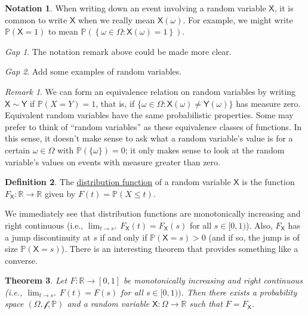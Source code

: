 \documentclass[11pt]{article}
\newcommand{\col}[1]{\mathscr{#1}}
\newcommand{\rv}[1]{\mathsf{#1}}
\newcommand{\p}{\mathbb{P}}
\newcommand{\defname}[1]{\underline{#1}}
\newcommand{\RR}{\mathbb{R}}
\theoremstyle{theorem}
\newtheorem{theorem}{Theorem}[section]
\theoremstyle{definition}
\newtheorem{definition}[theorem]{Definition}
\newtheorem{notation}[theorem]{Notation}
\theoremstyle{remark}
\newtheorem*{remark}{Remark}
\theoremstyle{step}
\theoremstyle{gap}
\newtheorem*{gap}{Gap}
\begin{document}
\begin{notation}
When writing down an event involving a random variable \(\rv{X}\), it is common to write \(\rv{X}\) when we really mean \(\rv{X}(\omega)\). For example, we might write \(\p(\rv{X} = 1)\) to mean \(\p\left(\left\{\omega \in \Omega : \rv{X}(\omega) = 1\right\}\right)\).
\end{notation}

\begin{gap}
The notation remark above could be made more clear.
\end{gap}

\begin{gap}
Add some examples of random variables.
\end{gap}

\begin{remark}
We can form an equivalence relation on random variables by writing \(\rv{X} \sim \rv{Y}\) if \(\p(X=Y)=1\), that is, if \(\{\omega \in \Omega : \rv{X}(\omega) \neq \rv{Y}(\omega)\}\) has measure zero. Equivalent random variables have the same probabilistic properties. Some may prefer to think of ``random variables'' as these equivalence classes of functions. In this sense, it doesn't make sense to ask what a random variable's value is for a certain \(\omega \in \Omega\) with \(\p(\{\omega\}) = 0\); it only makes sense to look at the random variable's values on events with measure greater than zero.
\end{remark}

\begin{definition}
The \defname{distribution function} of a random variable \(\rv{X}\) is the function \(F_\rv{X}: \RR \to \RR\) given by \(F(t) = \p(X \leq t)\).
\end{definition}

We immediately see that distribution functions are monotonically increasing and right continuous (i.e., \(\lim_{t\to s^+} F_\rv{X}(t) = F_\rv{X}(s)\) for all \(s \in [0,1)\)). Also, \(F_\rv{X}\) has a jump discontinuity at \(s\) if and only if \(\p(\rv{X} = s) > 0\) (and if so, the jump is of size \(\p(\rv{X} = s)\)). There is an interesting theorem that provides something like a converse.

\begin{theorem}
Let \(F:\RR \to [0,1]\) be monotonically increasing and right continuous (i.e., \(\lim_{t\to s^+} F(t) = F(s)\) for all \(s \in [0,1))\). Then there exists a probability space \((\Omega, \col{f}, \p)\) and a random variable \(\rv{X}:\Omega \to \RR\) such that \(F = F_\rv{X}\).
\end{theorem}
\end{document}

